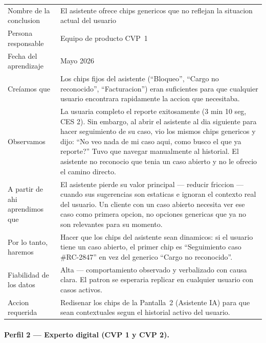 \documentclass[12pt,a4paper]{article}
\begin{document}
\begin{center}
\begin{tabularx}{\linewidth}{L{3.5cm}X}
\toprule
{}
 \\
\midrule
Nombre de la conclusion & El asistente ofrece chips genericos que no reflejan la situacion actual del usuario \\
Persona responsable & Equipo de producto CVP~1 \\
Fecha del aprendizaje & Mayo 2026 \\
Creíamos que & Los chips fijos del asistente (``Bloqueo'', ``Cargo no reconocido'',
``Facturacion'') eran suficientes para que cualquier usuario encontrara rapidamente
la accion que necesitaba. \\
Observamos & La usuaria completo el reporte exitosamente (3 min 10 seg, CES 2).
Sin embargo, al abrir el asistente al dia siguiente para hacer seguimiento de su
caso, vio los mismos chips genericos y dijo: ``No veo nada de mi caso aqui, como
busco el que ya reporte?'' Tuvo que navegar manualmente al historial. El asistente
no reconocio que tenia un caso abierto y no le ofrecio el camino directo. \\
A partir de ahi aprendimos que & El asistente pierde su valor principal --- reducir
friccion --- cuando sus sugerencias son estaticas e ignoran el contexto real del
usuario. Un cliente con un caso abierto necesita ver ese caso como primera opcion,
no opciones genericas que ya no son relevantes para su momento. \\
Por lo tanto, haremos & Hacer que los chips del asistente sean dinamicos: si el
usuario tiene un caso abierto, el primer chip es ``Seguimiento caso \#RC-2847''
en vez del generico ``Cargo no reconocido''. \\
Fiabilidad de los datos & Alta --- comportamiento observado y verbalizado con causa
clara. El patron se esperaria replicar en cualquier usuario con casos activos. \\
Accion requerida & Redisenar los chips de la Pantalla~2 (Asistente IA) para que
sean contextuales segun el historial activo del usuario. \\
\bottomrule
\end{tabularx}
\end{center}

\paragraph{Perfil 2 --- Experto digital (CVP 1 y CVP 2).}
\end{document}

